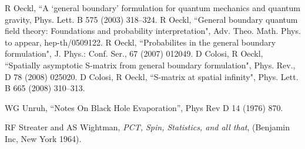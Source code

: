 \documentclass[11pt, nofootinbib]{revtex4-2}
\begin{document}
\begin{thebibliography}{9}
 R Oeckl, ``A `general boundary' formulation for quantum mechanics and
 quantum gravity, Phys. Lett. B 575 (2003) 318--324.
R Oeckl,
``General boundary quantum field theory: Foundations and probability 
interpretation", Adv. Theo. Math. Phys. to appear,  hep-th/0509122.
R Oeckl, ``Probabilites in the general boundary formulation", J. Phys.: Conf. Ser.,
67 (2007) 012049.
D Colosi, R Oeckl, 
``Spatially asymptotic S-matrix from general boundary formulation",
Phys. Rev., D 78 (2008) 025020. 
D Colosi, R Oeckl, ``S-matrix at 
spatial infinity", Phys. Lett. B 665 (2008) 310--313.
  
   WG Unruh, ``Notes On Black Hole Evaporation'', 
Phys Rev D {14} (1976) 870.


RF Streater and AS Wightman, {\em PCT, Spin, Statistics, and all that}, (Benjamin Inc, New York 1964).

\end{thebibliography}
\end{document}

